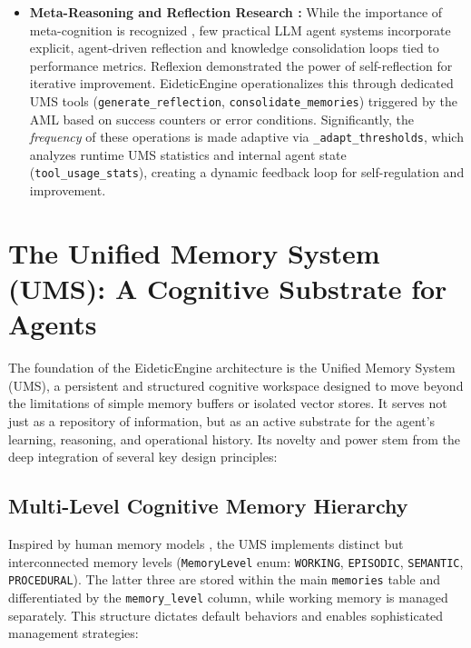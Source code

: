 \documentclass[12pt,a4paper]{article}
\newcommand{\code}[1]{\nolinkurl{#1}}
\begin{document}
\begin{itemize}
    \item \textbf{Meta-Reasoning and Reflection Research \cite{Ref14, Ref17}:} While the importance of meta-cognition is recognized \cite{Ref14}, few practical LLM agent systems incorporate explicit, agent-driven reflection and knowledge consolidation loops tied to performance metrics. Reflexion \cite{Ref17} demonstrated the power of self-reflection for iterative improvement. EideticEngine operationalizes this through dedicated UMS tools (\code{generate\_reflection}, \code{consolidate\_memories}) triggered by the AML based on success counters or error conditions. Significantly, the \textit{frequency} of these operations is made adaptive via \code{\_adapt\_thresholds}, which analyzes runtime UMS statistics and internal agent state (\code{tool\_usage\_stats}), creating a dynamic feedback loop for self-regulation and improvement.
\end{itemize}

\section{The Unified Memory System (UMS): A Cognitive Substrate for Agents}

The foundation of the EideticEngine architecture is the Unified Memory System (UMS), a persistent and structured cognitive workspace designed to move beyond the limitations of simple memory buffers or isolated vector stores. It serves not just as a repository of information, but as an active substrate for the agent's learning, reasoning, and operational history. Its novelty and power stem from the deep integration of several key design principles:

\subsection{Multi-Level Cognitive Memory Hierarchy}

Inspired by human memory models \cite{Ref3, Ref19}, the UMS implements distinct but interconnected memory levels (\code{MemoryLevel} enum: \code{WORKING}, \code{EPISODIC}, \code{SEMANTIC}, \code{PROCEDURAL}). The latter three are stored within the main \code{memories} table and differentiated by the \code{memory\_level} column, while working memory is managed separately. This structure dictates default behaviors and enables sophisticated management strategies:
\end{document}
